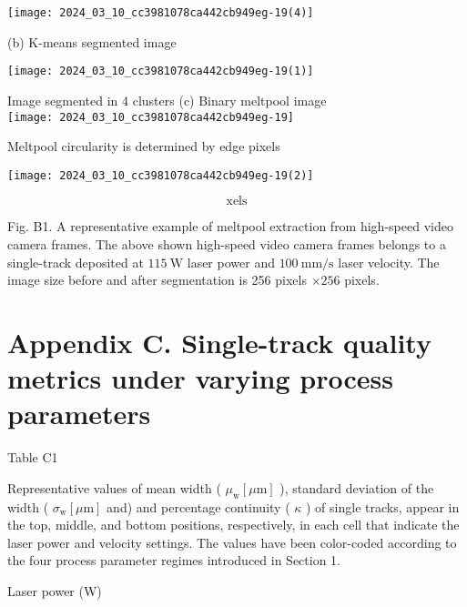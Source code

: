 \documentclass[10pt]{article}
\begin{document}
\begin{center}
\texttt{[image: 2024\_03\_10\_cc3981078ca442cb949eg-19(4)]}
\end{center}

(b) K-means segmented image

\begin{center}
\texttt{[image: 2024\_03\_10\_cc3981078ca442cb949eg-19(1)]}
\end{center}

Image segmented in 4 clusters (c) Binary meltpool image\\
\texttt{[image: 2024\_03\_10\_cc3981078ca442cb949eg-19]}

Meltpool circularity is determined by edge pixels

\begin{center}
\texttt{[image: 2024\_03\_10\_cc3981078ca442cb949eg-19(2)]}
\end{center}

$$
\text { xels }
$$

Fig. B1. A representative example of meltpool extraction from high-speed video camera frames. The above shown high-speed video camera frames belongs to a single-track deposited at $115 \mathrm{~W}$ laser power and $100 \mathrm{~mm} / \mathrm{s}$ laser velocity. The image size before and after segmentation is 256 pixels $\times 256$ pixels.

\section*{Appendix C. Single-track quality metrics under varying process parameters}
Table C1

Representative values of mean width ( $\mu_{\mathrm{w}}[\mu \mathrm{m}]$ ), standard deviation of the width ( $\sigma_{\mathrm{w}}[\mu \mathrm{m}]$ and) and percentage continuity ( $\kappa$ ) of single tracks, appear in the top, middle, and bottom positions, respectively, in each cell that indicate the laser power and velocity settings. The values have been color-coded according to the four process parameter regimes introduced in Section 1.

Laser power (W)
\end{document}

